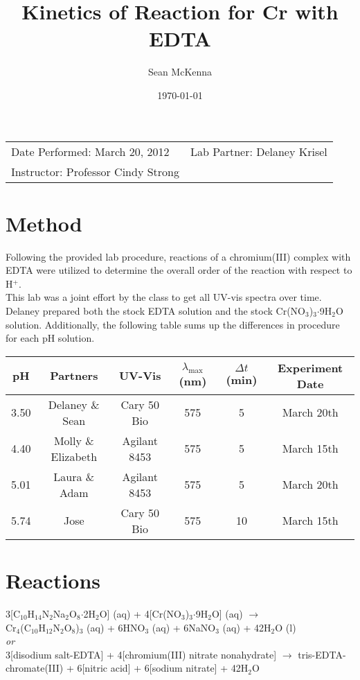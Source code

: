 \documentclass[11pt]{article}
\title{Kinetics of Reaction for Cr\super{3+} with EDTA}
\author{Sean McKenna}
\date{\today}
\newcommand{\super}[1]{\ensuremath{^{\textrm{#1}}}}
\newcommand{\sub}[1]{\ensuremath{_{\textrm{#1}}}}
\begin{document}
\maketitle

\begin{center}
\begin{tabular}{lr}
Date Performed: March 20, 2012 & Lab Partner: Delaney Krisel \\
Instructor: Professor Cindy Strong
\end{tabular}
\end{center}


\section{Method}
Following the provided lab procedure,\cite{lab} reactions of a chromium(III) complex with EDTA were utilized to determine the overall order of the reaction with respect to H\super{+}. \\

This lab was a joint effort by the class to get all UV-vis spectra over time. Delaney prepared both the stock EDTA solution and the stock Cr(NO\sub{3})\sub{3}$\cdot$9H\sub{2}O solution. Additionally, the following table sums up the differences in procedure for each pH solution.

\begin{center}
\begin{tabular}{|c|c|c|c|c|c|}
\hline
\textbf{pH} & \textbf{Partners} & \textbf{UV-Vis} & \textbf{$\lambda$\sub{max} (nm)} & \textbf{$\Delta t$ (min)} & \textbf{Experiment Date} \\
\hline
3.50 & Delaney \& Sean & Cary 50 Bio & 575 & 5 & March 20th \\
4.40 & Molly \& Elizabeth & Agilant 8453 & 575 & 5 & March 15th \\
5.01 & Laura \& Adam & Agilant 8453 & 575 & 5 & March 20th \\
5.74 & Jose & Cary 50 Bio & 575 & 10 & March 15th \\
\hline
\end{tabular}
\end{center}


\section{Reactions}
\begin{center}
3[C\sub{10}H\sub{14}N\sub{2}Na\sub{2}O\sub{8}$\cdot$2H\sub{2}O] (aq) + 4[Cr(NO\sub{3})\sub{3}$\cdot$9H\sub{2}O] (aq) $\rightarrow$ \\ Cr\sub{4}(C\sub{10}H\sub{12}N\sub{2}O\sub{8})\sub{3} (aq) + 6HNO\sub{3} (aq) + 6NaNO\sub{3} (aq) + 42H\sub{2}O (l) \\
\textit{or} \\
3[disodium salt-EDTA] + 4[chromium(III) nitrate nonahydrate] $\rightarrow$ tris-EDTA-chromate(III) + 6[nitric acid] + 6[sodium nitrate] + 42H\sub{2}O
\end{center}
\end{document}
